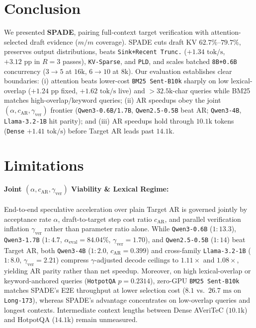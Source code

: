 \documentclass[11pt]{article}
\begin{document}
\section{Conclusion}
\label{sec:conclusion}
We presented \textbf{SPADE}, pairing full-context target verification with attention-selected draft evidence ($m/m$ coverage). SPADE cuts draft KV $62.7\%\text{--}79.7\%$, preserves output distributions, beats \texttt{Sink+Recent Trunc.} ($+1.34\text{ tok/s}$, $+3.12\text{ pp}$ in $R=3$ passes), \texttt{KV-Sparse}, and \texttt{PLD}, and scales batched \texttt{8B+0.6B} concurrency ($3 \to 5$ at $16\text{k}$, $6 \to 10$ at $8\text{k}$). Our evaluation establishes clear boundaries: (i) attention beats lower-cost \texttt{BM25 Sent-B10k} sharply on low lexical-overlap ($+1.24\text{ pp}$ fixed, $+1.62\text{ tok/s}$ live) and $>32.5\text{k}$-char queries while BM25 matches high-overlap/keyword queries; (ii) AR speedups obey the joint $(\alpha, c_{\text{AR}}, \gamma_{\text{ver}})$ frontier (\texttt{Qwen3-0.6B/1.7B}, \texttt{Qwen2.5-0.5B} beat AR; \texttt{Qwen3-4B}, \texttt{Llama-3.2-1B} hit parity); and (iii) AR speedups hold through $10.1\text{k}$ tokens (\texttt{Dense} $+1.41\text{ tok/s}$) before Target AR leads past $14.1\text{k}$.

\clearpage
\section*{Limitations}
\paragraph{Joint $(\alpha, c_{\text{AR}}, \gamma_{\text{ver}})$ Viability \& Lexical Regime:}
End-to-end speculative acceleration over plain Target AR is governed jointly by acceptance rate $\alpha$, draft-to-target step cost ratio $c_{\text{AR}}$, and parallel verification inflation $\gamma_{\text{ver}}$ rather than parameter ratio alone. While \texttt{Qwen3-0.6B} ($1:13.3$), \texttt{Qwen3-1.7B} ($1:4.7$, $\alpha_{\text{eval}}=84.04\%$, $\gamma_{\text{ver}}=1.70$), and \texttt{Qwen2.5-0.5B} ($1:14$) beat Target AR, both \texttt{Qwen3-4B} ($1:2.0$, $c_{\text{AR}}=0.399$) and cross-family \texttt{Llama-3.2-1B} ($1:8.0$, $\gamma_{\text{ver}}=2.21$) compress $\gamma$-adjusted decode ceilings to $1.11\times$ and $1.08\times$, yielding AR parity rather than net speedup. Moreover, on high lexical-overlap or keyword-anchored queries (\texttt{HotpotQA} $p=0.2314$), zero-GPU \texttt{BM25 Sent-B10k} matches SPADE's E2E throughput at lower selection cost ($8.1$ vs.\ $26.7\text{ ms}$ on \texttt{Long-173}), whereas SPADE's advantage concentrates on low-overlap queries and longest contexts. Intermediate context lengths between Dense AVeriTeC ($10.1\text{k}$) and HotpotQA ($14.1\text{k}$) remain unmeasured.
\end{document}
